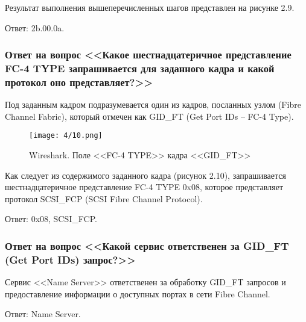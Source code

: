 Результат выполнения вышеперечисленных шагов представлен на рисунке 2.9.

Ответ: 2b.00.0a.

\subsubsection{Ответ на вопрос <<Какое шестнадцатеричное представление FC-4
    TYPE запрашивается для заданного кадра и какой протокол оно
    представляет?>>}

Под заданным кадром подразумевается один из кадров, посланных узлом (Fibre
Channel Fabric), который отмечен как GID\_FT (Get Port IDs -- FC-4 Type).

\begin{figure}[ht]
    \centering\texttt{[image: 4/10.png]}
    \caption{Wireshark. Поле <<FC-4 TYPE>> кадра <<GID\_FT>>}
\end{figure}

Как следует из содержимого заданного кадра (рисунок 2.10), запрашивается
шестнадцатеричное представление FC-4 TYPE 0x08, которое представляет протокол
SCSI\_FCP (SCSI Fibre Channel Protocol).

Ответ: 0x08, SCSI\_FCP.

\subsubsection{Ответ на вопрос <<Какой сервис ответственен за GID\_FT (Get Port
    IDs) запрос?>>}

Сервис <<Name Server>> ответственен за обработку GID\_FT запросов и
предоставление информации о доступных портах в сети Fibre Channel.

Ответ: Name Server.
